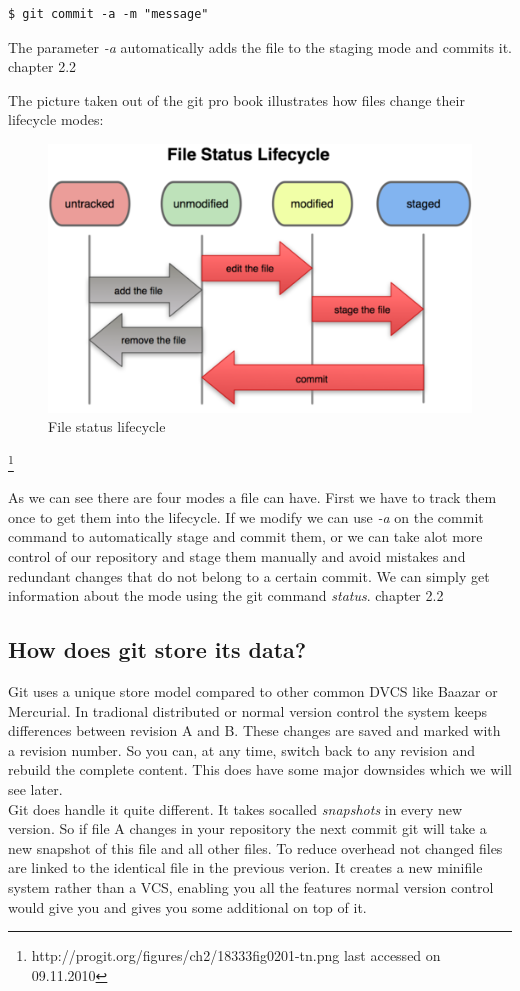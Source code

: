 \begin{lstlisting}
$ git commit -a -m "message"
\end{lstlisting}

The parameter \emph{-a} automatically adds the file to the staging mode and
commits it. \cite{gitpro2009} chapter 2.2

The picture taken out of the git pro book illustrates how files change their
lifecycle modes:

\begin{figure}[h]
  \centering
  \includegraphics{img/file_status_lifecycle}
  \caption{File status lifecycle}
  \label{fig:File status lifecycle}
  
\end{figure} \footnote{http://progit.org/figures/ch2/18333fig0201-tn.png last accessed on 
09.11.2010}

As we can see there are four modes a file can have. First we have to track them
once to get them into the lifecycle. If we modify we can use \emph{-a} on the
commit command to automatically stage and commit them, or we can take alot more
control of our repository and stage them manually and avoid mistakes and
redundant changes that do not belong to a certain commit.
We can simply get information about the mode using the git command
\emph{status}. \cite{gitpro2009} chapter 2.2

\subsection{How does git store its data?}
Git uses a unique store model compared to other common DVCS like Baazar or Mercurial. 
In tradional distributed or normal version control the system keeps differences between revision A and B. 
These changes are saved and marked with a revision number. 
So you can, at any time, switch back to any revision and rebuild the complete content.
This does have some major downsides which we will see later. \\
Git does handle it quite different. It takes socalled \emph{snapshots} in every
new version. So if file A changes in your repository the next commit git will take a new snapshot of this file and all other files. 
To reduce overhead not changed files are linked to the identical file in the previous verion. 
It creates a new minifile system rather than a VCS, enabling you all the features normal version 
control would give you and gives you some additional on top of it. \cite{gitpro2009} 

